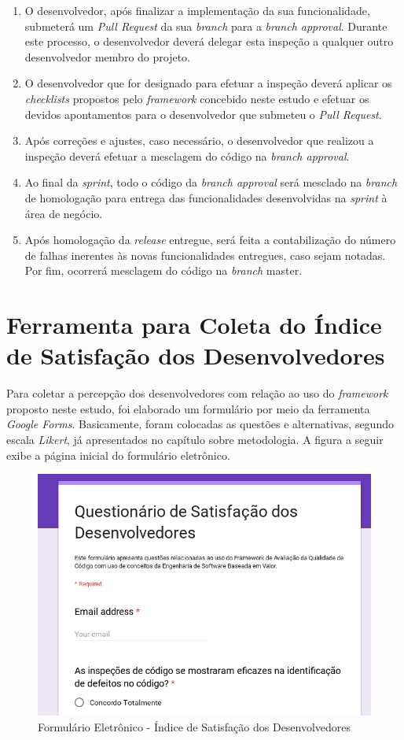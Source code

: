 \begin{enumerate}
	\item O desenvolvedor, após finalizar a implementação da sua funcionalidade, submeterá um \textit{Pull Request} da sua \textit{branch} para a \textit{branch approval}. Durante este processo, o desenvolvedor deverá delegar esta inspeção a qualquer outro desenvolvedor membro do projeto.

	\item O desenvolvedor que for designado para efetuar a inspeção deverá aplicar os \textit{checklists} propostos pelo \textit{framework} concebido neste estudo e efetuar os devidos apontamentos para o desenvolvedor que submeteu o \textit{Pull Request}.

	\item Após correções e ajustes, caso necessário, o desenvolvedor que realizou a inspeção deverá efetuar a mesclagem do código na \textit{branch approval}.

	\item Ao final da \textit{sprint}, todo o código da \textit{branch approval} será mesclado na \textit{branch} de homologação para entrega das funcionalidades desenvolvidas na \textit{sprint} à área de negócio.

	\item Após homologação da \textit{release} entregue, será feita a contabilização do número de falhas inerentes às novas funcionalidades entregues, caso sejam notadas. Por fim, ocorrerá mesclagem do código na \textit{branch} master.
\end{enumerate}

\section{Ferramenta para Coleta do Índice de Satisfação dos Desenvolvedores}

Para coletar a percepção dos desenvolvedores com relação ao uso do \textit{framework} proposto neste estudo, foi elaborado um formulário por meio da ferramenta \textit{Google Forms}. Basicamente, foram colocadas as questões e alternativas, segundo escala \textit{Likert}, já apresentados no capítulo sobre metodologia. A figura a seguir exibe a página inicial do formulário eletrônico.

\begin{figure}[!h]
\includegraphics[width=\textwidth]{figuras/questionario.png}
\caption{Formulário Eletrônico - Índice de Satisfação dos Desenvolvedores}
\end{figure}